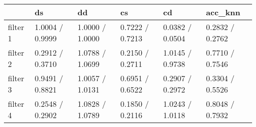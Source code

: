 \begin{tabular}{llllll}
\toprule
{} &               ds &               dd &               cs &               cd &          acc\_knn \\
\midrule
filter 1 &  1.0004 / 0.9999 &  1.0000 / 1.0000 &  0.7222 / 0.7213 &  0.0382 / 0.0504 &  0.2832 / 0.2762 \\
filter 2 &  0.2912 / 0.3710 &  1.0788 / 1.0699 &  0.2150 / 0.2711 &  1.0145 / 0.9738 &  0.7710 / 0.7546 \\
filter 3 &  0.9491 / 0.8821 &  1.0057 / 1.0131 &  0.6951 / 0.6522 &  0.2907 / 0.2972 &  0.3304 / 0.5526 \\
filter 4 &  0.2548 / 0.2902 &  1.0828 / 1.0789 &  0.1850 / 0.2116 &  1.0243 / 1.0118 &  0.8048 / 0.7932 \\
\bottomrule
\end{tabular}
